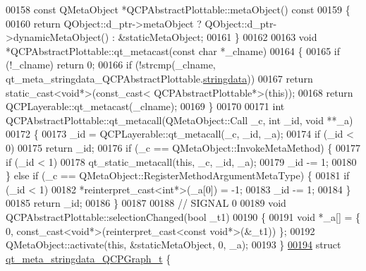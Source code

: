 \begin{DoxyCode}
00158 \textcolor{keyword}{const} QMetaObject *QCPAbstractPlottable::metaObject()\textcolor{keyword}{ const}
00159 \textcolor{keyword}{}\{
00160     \textcolor{keywordflow}{return} QObject::d\_ptr->metaObject ? QObject::d\_ptr->dynamicMetaObject() : &staticMetaObject;
00161 \}
00162 
00163 \textcolor{keywordtype}{void} *QCPAbstractPlottable::qt\_metacast(\textcolor{keyword}{const} \textcolor{keywordtype}{char} *\_clname)
00164 \{
00165     \textcolor{keywordflow}{if} (!\_clname) \textcolor{keywordflow}{return} 0;
00166     \textcolor{keywordflow}{if} (!strcmp(\_clname, qt\_meta\_stringdata\_QCPAbstractPlottable.\hyperlink{a00016_ab78c50bc348c723bab72ef878f28856c}{stringdata}))
00167         \textcolor{keywordflow}{return} \textcolor{keyword}{static\_cast<}\textcolor{keywordtype}{void}*\textcolor{keyword}{>}(\textcolor{keyword}{const\_cast<} QCPAbstractPlottable*\textcolor{keyword}{>}(\textcolor{keyword}{this}));
00168     \textcolor{keywordflow}{return} QCPLayerable::qt\_metacast(\_clname);
00169 \}
00170 
00171 \textcolor{keywordtype}{int} QCPAbstractPlottable::qt\_metacall(QMetaObject::Call \_c, \textcolor{keywordtype}{int} \_id, \textcolor{keywordtype}{void} **\_a)
00172 \{
00173     \_id = QCPLayerable::qt\_metacall(\_c, \_id, \_a);
00174     \textcolor{keywordflow}{if} (\_id < 0)
00175         \textcolor{keywordflow}{return} \_id;
00176     \textcolor{keywordflow}{if} (\_c == QMetaObject::InvokeMetaMethod) \{
00177         \textcolor{keywordflow}{if} (\_id < 1)
00178             qt\_static\_metacall(\textcolor{keyword}{this}, \_c, \_id, \_a);
00179         \_id -= 1;
00180     \} \textcolor{keywordflow}{else} \textcolor{keywordflow}{if} (\_c == QMetaObject::RegisterMethodArgumentMetaType) \{
00181         \textcolor{keywordflow}{if} (\_id < 1)
00182             *\textcolor{keyword}{reinterpret\_cast<}\textcolor{keywordtype}{int}*\textcolor{keyword}{>}(\_a[0]) = -1;
00183         \_id -= 1;
00184     \}
00185     \textcolor{keywordflow}{return} \_id;
00186 \}
00187 
00188 \textcolor{comment}{// SIGNAL 0}
00189 \textcolor{keywordtype}{void} QCPAbstractPlottable::selectionChanged(\textcolor{keywordtype}{bool} \_t1)
00190 \{
00191     \textcolor{keywordtype}{void} *\_a[] = \{ 0, \textcolor{keyword}{const\_cast<}\textcolor{keywordtype}{void}*\textcolor{keyword}{>}(\textcolor{keyword}{reinterpret\_cast<}\textcolor{keyword}{const }\textcolor{keywordtype}{void}*\textcolor{keyword}{>}(&\_t1)) \};
00192     QMetaObject::activate(\textcolor{keyword}{this}, &staticMetaObject, 0, \_a);
00193 \}
\hypertarget{a00016_source_l00194}{}\hyperlink{a00016}{00194} \textcolor{keyword}{struct }\hyperlink{a00016_d5/d1e/a00103}{qt\_meta\_stringdata\_QCPGraph\_t} \{

\end{DoxyCode}
